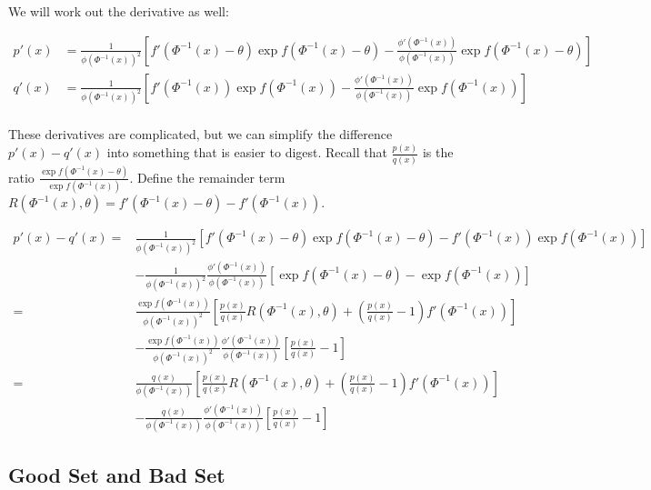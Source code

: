 \documentclass{article}
\begin{document}
We will work out the derivative as well:

\begin{align*}
p'(x) &= \frac{1}{\phi(\Phi^{-1}(x))^2} \left[ f'(\Phi^{-1}(x) - \theta) \exp f(\Phi^{-1}(x)-\theta) -
                       \frac{\phi'(\Phi^{-1}(x))}{\phi(\Phi^{-1}(x))} \exp f(\Phi^{-1}(x) - \theta) \right] \\
q'(x) &= \frac{1}{\phi(\Phi^{-1}(x))^2} \left[ f'(\Phi^{-1}(x)) \exp f(\Phi^{-1}(x)) -
                       \frac{\phi'(\Phi^{-1}(x))}{\phi(\Phi^{-1}(x))} \exp f(\Phi^{-1}(x)) \right] \\
\end{align*}

These derivatives are complicated, but we can simplify the difference $p'(x) - q'(x)$ into something that is easier to digest. Recall that $\frac{p(x)}{q(x)}$ is the ratio $\frac{\exp f(\Phi^{-1}(x) - \theta)}{\exp f(\Phi^{-1}(x))}$. Define the remainder term $R(\Phi^{-1}(x), \theta) = f'(\Phi^{-1}(x) - \theta) - f'(\Phi^{-1}(x))$. 

\begin{align*}
p'(x) - q'(x) = & \frac{1}{\phi(\Phi^{-1}(x))^2} \left[ 
              f'(\Phi^{-1}(x) - \theta) \exp f(\Phi^{-1}(x) - \theta) - f'(\Phi^{-1}(x)) \exp f(\Phi^{-1}(x)) \right] \\
      &  - \frac{1}{\phi(\Phi^{-1}(x))^2} \frac{\phi'(\Phi^{-1}(x))}{\phi(\Phi^{-1}(x))} \left[ \exp f(\Phi^{-1}(x) - \theta) - \exp f(\Phi^{-1}(x)) \right] \\
    = & \frac{\exp f(\Phi^{-1}(x)) }{\phi(\Phi^{-1}(x))^2} \left[ 
             \frac{p(x)}{q(x)} R(\Phi^{-1}(x), \theta) + 
             \left(\frac{p(x)}{q(x)} - 1 \right) f'(\Phi^{-1}(x))  \right] \\
   & - \frac{\exp f(\Phi^{-1}(x)) }{\phi(\Phi^{-1}(x))^2} \frac{\phi'(\Phi^{-1}(x))}{\phi(\Phi^{-1}(x))}  \left[ \frac{p(x)}{q(x)} - 1  \right] \\
 = & \frac{q(x) }{\phi(\Phi^{-1}(x))} \left[ 
             \frac{p(x)}{q(x)} R(\Phi^{-1}(x), \theta) + 
             \left(\frac{p(x)}{q(x)} - 1 \right) f'(\Phi^{-1}(x))  \right] \\
   & - \frac{ q(x) }{\phi(\Phi^{-1}(x))} \frac{\phi'(\Phi^{-1}(x))}{\phi(\Phi^{-1}(x))}  \left[ \frac{p(x)}{q(x)} - 1  \right] 
\end{align*}



\subsection{Good Set and Bad Set}
\end{document}

